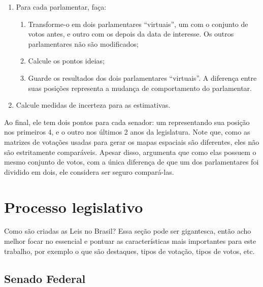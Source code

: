 \documentclass[a4paper,titlepage]{ppgi}\usepackage[]{graphicx}\usepackage[]{color}
\begin{document}
\begin{enumerate}
  \item Para cada parlamentar, faça:
    \begin{enumerate}
      \item Transforme-o em dois parlamentares ``virtuais'', um com o conjunto
de votos antes, e outro com os depois da data de interesse. Os outros
parlamentares não são modificados;
      \item Calcule os pontos ideias;
      \item Guarde os resultados dos dois parlamentares ``virtuais''. A
diferença entre suas posições representa a mudança de comportamento do
parlamentar.
    \end{enumerate}
  \item Calcule medidas de incerteza para as estimativas.
\end{enumerate}

Ao final, ele tem dois pontos para cada senador: um representando sua posição
nos primeiros 4, e o outro nos últimos 2 anos da legislatura. Note que, como as
matrizes de votações usadas para gerar os mapas espaciais são diferentes, eles
não são estritamente comparáveis. Apesar disso, 
argumenta que como elas possuem o mesmo conjunto de votos, com a única
diferença de que um dos parlamentares foi dividido em dois, ele considera ser
seguro compará-las.

\section{Processo legislativo}

Como são criadas as Leis no Brasil? Essa seção pode ser gigantesca, então acho melhor focar no essencial e pontuar as características mais importantes para este trabalho, por exemplo o que são destaques, tipos de votação, tipos de votos, etc.

%

\subsection{Senado Federal}
\end{document}
